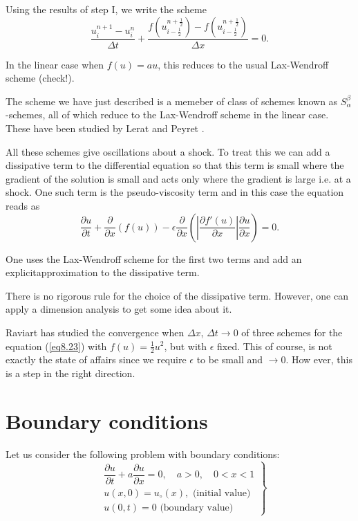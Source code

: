 \medskip
{}
Using the results of step I, we write the scheme
\begin{equation*}
\frac{u^{n+1}_i - u^n_i}{\Delta t} +
\frac{f\left(u^{n+\frac{1}{2}}_{i-\frac{1}{2}}\right) -
  f\left(u^{n+\frac{1}{2}}_{i-\frac{1}{2}}\right) }{\Delta x}=
0.\tag{8.22}\label{eq8.22} 
\end{equation*}

In the linear case when $f(u) = au$, this reduces to the usual Lax-Wendroff scheme (check!).

The scheme we have just described is a memeber of class of schemes known as $S^\beta_\alpha$-schemes, all of which reduce to the Lax-Wendroff scheme in the linear case. These have been studied by Lerat and Peyret \cite{key25}.

All these schemes give oscillations about a shock. To treat this we can add a dissipative term to the differential equation so that this term is small where the gradient of the solution is small and acts only where the gradient is large i.e. at a shock. One such term is the pseudo-viscosity term and in this case the equation reads as
\begin{equation*}
\frac{\partial u}{\partial t} + \frac{\partial }{\partial x} (f(u)) -
\epsilon \frac{\partial }{\partial x} \left(|\frac{\partial f'(u)}{\partial
  x}| \frac{\partial u}{\partial x}\right) =0. \tag{8.23}\label{eq8.23} 
\end{equation*}

One uses the Lax-Wendroff scheme for the first two terms and add an explicit\pageoriginale approximation to the dissipative term.

There is no rigorous rule for the choice of the dissipative term. However, one can apply a dimension analysis to get some idea about it.

Raviart \cite{key31} has studied the convergence when $\Delta x$, $\Delta t \to 0$ of three schemes for the equation (\ref{eq8.23}) with $f(u) = \frac{1}{2} u^2$, but with $\epsilon$ fixed. This of course, is not exactly the state of affairs since we require $\epsilon$ to be small and $\to 0$. How ever, this is a step in the right direction.

\section{Boundary conditions}\label{chap8:sec8.6}
Let us consider the following problem with boundary conditions:
\begin{equation*}
\left.
\begin{aligned}
& \dfrac{\partial u}{\partial t} +  a \dfrac{\partial u}{\partial x} =
  0, \quad a > 0, \quad 0 < x < 1\\ 
& u(x,0) = u_\circ (x), \text{ (initial value)}\\
& u(0, t) = 0 \text{ (boundary value)}
\end{aligned}
\right\}\tag{8.24}\label{eq8.24}
\end{equation*}

